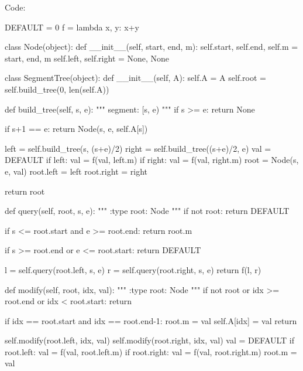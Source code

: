 Code:
\begin{python}
DEFAULT = 0
f = lambda x, y: x+y


class Node(object):
    def __init__(self, start, end, m):
        self.start, self.end, self.m = start, end, m
        self.left, self.right = None, None


class SegmentTree(object):
    def __init__(self, A):
        self.A = A
        self.root = self.build_tree(0, len(self.A))

    def build_tree(self, s, e):
        """
        segment: [s, e)
        """
        if s >= e:
            return None

        if s+1 == e:
            return Node(s, e, self.A[s])

        left = self.build_tree(s, (s+e)/2)
        right = self.build_tree((s+e)/2, e)
        val = DEFAULT
        if left: val = f(val, left.m)
        if right: val = f(val, right.m)
        root = Node(s, e, val)
        root.left = left
        root.right = right

        return root

    def query(self, root, s, e):
        """
        :type root: Node
        """
        if not root:
            return DEFAULT

        if s <= root.start and e >= root.end:
            return root.m

        if s >= root.end or e <= root.start:
            return DEFAULT

        l = self.query(root.left, s, e)
        r = self.query(root.right, s, e)
        return f(l, r)

    def modify(self, root, idx, val):
        """
        :type root: Node
        """
        if not root or idx >= root.end or idx < root.start:
            return

        if idx == root.start and idx == root.end-1:
            root.m = val
            self.A[idx] = val
            return

        self.modify(root.left, idx, val)
        self.modify(root.right, idx, val)
        val = DEFAULT
        if root.left: val = f(val, root.left.m)
        if root.right: val = f(val, root.right.m)
        root.m = val
\end{python}
